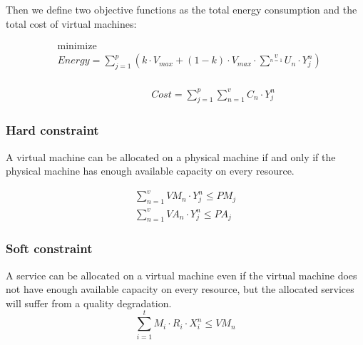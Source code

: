 Then we define two objective functions as the total energy consumption and the total cost of virtual machines:

\begin{equation}
\label{eq:energy}
\begin{aligned}
& {\text{minimize}}\\
& Energy = \sum\limits_{j=1}^p (k \cdot V_{max} + (1 - k) \cdot V_{max} \cdot \sum^v\limits_{n=1} U_n \cdot Y^n_j)\\
\end{aligned}
\end{equation}

\begin{equation}
\label{eq:cost}
\begin{aligned}
& & & & & & & Cost = \sum\limits_{j=1}^p\sum\limits_{n=1}^v C_n \cdot Y^n_j
\end{aligned}
\end{equation}

\subsubsection{Hard constraint}
A virtual machine can be allocated on a physical machine if and 
only if the physical machine has enough available capacity on every resource.

\begin{equation} 
\label{eq:constraint}
\begin{aligned}
\sum\limits_{n=1}^v VM_n \cdot Y^n_j \leq PM_j\\
\sum\limits_{n=1}^v VA_n \cdot Y^n_j \leq PA_j
\end{aligned}
\end{equation}

\subsubsection{Soft constraint}
A service can be allocated on a virtual machine even if the 
virtual machine does not have enough available capacity on every resource, but the allocated services will suffer from a quality 
degradation.
\begin{equation}
\sum\limits_{i=1}^t M_i \cdot R_i \cdot X_i^n  \leq VM_n
\end{equation}

